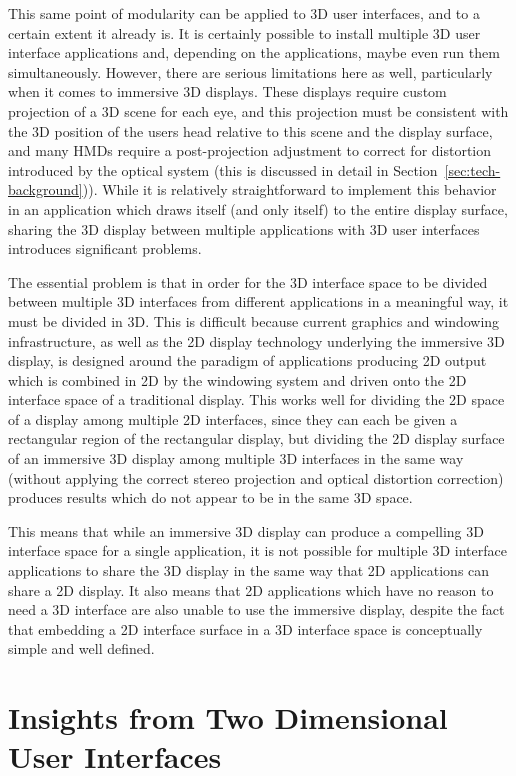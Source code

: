 This same point of modularity can be applied to 3D user interfaces, and to a certain extent it already is. It is certainly possible to install multiple 3D user interface applications and, depending on the applications, maybe even run them simultaneously. However, there are serious limitations here as well, particularly when it comes to immersive 3D displays. These displays require custom projection of a 3D scene for each eye, and this projection must be consistent with the 3D position of the users head relative to this scene and the display surface, and many HMDs require a post-projection adjustment to correct for distortion introduced by the optical system (this is discussed in detail in Section~\ref{sec:tech-background})). While it is relatively straightforward to implement this behavior in an application which draws itself (and only itself) to the entire display surface, sharing the 3D display between multiple applications with 3D user interfaces introduces significant problems.
	
The essential problem is that in order for the 3D interface space to be divided between multiple 3D interfaces from different applications in a meaningful way, it must be divided in 3D. This is difficult because current graphics and windowing infrastructure, as well as the 2D display technology underlying the immersive 3D display, is designed around the paradigm of applications producing 2D output which is combined in 2D by the windowing system and driven onto the 2D interface space of a traditional display. This works well for dividing the 2D space of a display among multiple 2D interfaces, since they can each be given a rectangular region of the rectangular display, but dividing the 2D display surface of an immersive 3D display among multiple 3D interfaces in the same way (without applying the correct stereo projection and optical distortion correction) produces results which do not appear to be in the same 3D space. 

This means that while an immersive 3D display can produce a compelling 3D interface space for a single application, it is not possible for multiple 3D interface applications to share the 3D display in the same way that 2D applications can share a 2D display. It also means that 2D applications which have no reason to need a 3D interface are also unable to use the immersive display, despite the fact that embedding a 2D interface surface in a 3D interface space is conceptually simple and well defined.

\section{Insights from Two Dimensional User Interfaces}


